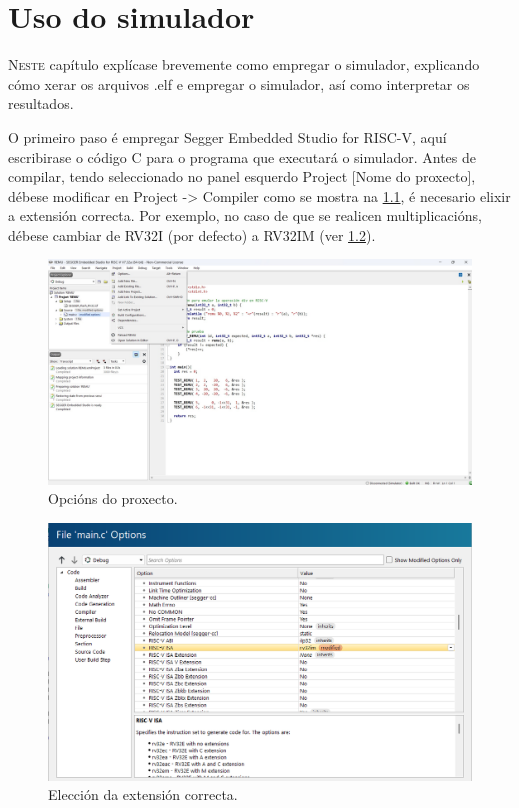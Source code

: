 \chapter{Uso do simulador}
\label{chap:uso_simulador}

\lettrine{N}{este} capítulo explícase brevemente como empregar o simulador, explicando cómo xerar os arquivos .elf e empregar o simulador, así como interpretar os resultados. 

O primeiro paso é empregar Segger Embedded Studio for RISC-V, aquí escribirase o código C para o programa que executará o simulador. Antes de compilar, tendo seleccionado no panel esquerdo Project [Nome do proxecto], débese modificar en Project -> Compiler como se mostra na \ref{fig:cap1}, é necesario elixir a extensión correcta. Por exemplo, no caso de que se realicen multiplicacións, débese cambiar de RV32I (por defecto) a RV32IM (ver \ref{fig:cap2}).

\begin{figure}[hp!]
  \centering
  \includegraphics[width=\textwidth]{imaxes/Cap_1.jpg}
  \caption{Opcións do proxecto.}
  \label{fig:cap1}
\end{figure}

\begin{figure}[hp!]
  \centering
  \includegraphics[width=\textwidth]{imaxes/Cap_2.png}
  \caption{Elección da extensión correcta.}
  \label{fig:cap2}
\end{figure}

